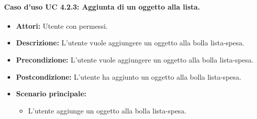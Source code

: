 \paragraph{Caso d'uso UC 4.2.3: Aggiunta di un oggetto alla lista.}
\label{Caso d'uso UC 4.2.3: Aggiunta di un oggetto alla lista.}

\FloatBarrier
\begin{itemize}
\item \textbf{Attori:} Utente con permessi.
\item \textbf{Descrizione:} L'utente vuole aggiungere un oggetto alla bolla lista-spesa.
\item \textbf{Precondizione:} L'utente vuole aggiungere un oggetto alla bolla lista-spesa. 
\item \textbf{Postcondizione:} L'utente ha aggiunto un oggetto alla bolla lista-spesa.
\item \textbf{Scenario principale:}
	\begin{itemize}
	\item{L'utente aggiunge un oggetto alla bolla lista-spesa.}
	\end{itemize}
\end{itemize}